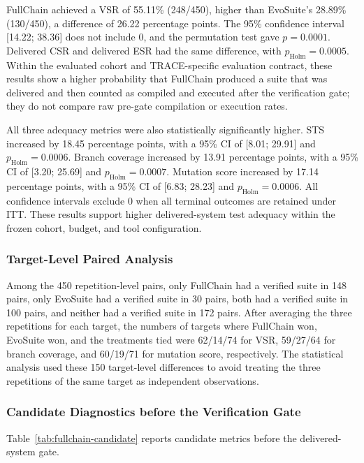 \documentclass[pdflatex,sn-basic,Numbered,iicol]{sn-jnl}
\begin{document}
FullChain achieved a VSR of 55.11\% (248/450), higher than EvoSuite's 28.89\% (130/450), a difference of 26.22 percentage points. The 95\% confidence interval [14.22; 38.36] does not include 0, and the permutation test gave $p=0.0001$. Delivered CSR and delivered ESR had the same difference, with $p_{\mathrm{Holm}}=0.0005$. Within the evaluated cohort and TRACE-specific evaluation contract, these results show a higher probability that FullChain produced a suite that was delivered and then counted as compiled and executed after the verification gate; they do not compare raw pre-gate compilation or execution rates.

All three adequacy metrics were also statistically significantly higher. STS increased by 18.45 percentage points, with a 95\% CI of [8.01; 29.91] and $p_{\mathrm{Holm}}=0.0006$. Branch coverage increased by 13.91 percentage points, with a 95\% CI of [3.20; 25.69] and $p_{\mathrm{Holm}}=0.0007$. Mutation score increased by 17.14 percentage points, with a 95\% CI of [6.83; 28.23] and $p_{\mathrm{Holm}}=0.0006$. All confidence intervals exclude 0 when all terminal outcomes are retained under ITT. These results support higher delivered-system test adequacy within the frozen cohort, budget, and tool configuration.

\subsubsection{Target-Level Paired Analysis}\label{subsubsec:fullchain-paired}

Among the 450 repetition-level pairs, only FullChain had a verified suite in 148 pairs, only EvoSuite had a verified suite in 30 pairs, both had a verified suite in 100 pairs, and neither had a verified suite in 172 pairs. After averaging the three repetitions for each target, the numbers of targets where FullChain won, EvoSuite won, and the treatments tied were 62/14/74 for VSR, 59/27/64 for branch coverage, and 60/19/71 for mutation score, respectively. The statistical analysis used these 150 target-level differences to avoid treating the three repetitions of the same target as independent observations.

\subsubsection{Candidate Diagnostics before the Verification Gate}\label{subsubsec:fullchain-candidate}

Table~\ref{tab:fullchain-candidate} reports candidate metrics before the delivered-system gate.
\end{document}
